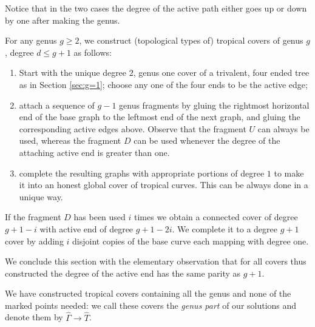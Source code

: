 \documentclass[11pt,reqno]{amsart}
\theoremstyle{definition}
\newcommand\trop{{\mathtt{trop}}}
\newcommand\Mgn[1]{\mathcal M_{#1}}
\newcommand{\gGamma}{\widehat{\Gamma}}
\newcommand{\gT}{\widehat{T}}
\begin{document}
Notice that in the two cases the degree of the active path either goes up or down by one after making the genus. %

For any genus $g\geq 2$, we construct (topological types of) tropical covers of genus $g$, degree $d\leq g+1$ as follows:
\begin{enumerate}
\item Start with the unique degree $2$,  genus one cover of a trivalent, four ended tree as in Section \ref{sec:g=1}; choose any one of the four ends to be the active edge;
\item attach a sequence of $g-1$ genus fragments by gluing the rightmost horizontal end of the base graph to the leftmost end of the next graph,  and gluing the corresponding active edges above. Observe that the fragment $U$ can always be used,  whereas the fragment $D$ can be used whenever the degree of the attaching active end is greater than one.
\item complete the resulting graphs with appropriate portions of degree $1$ to make it into an honest global cover of tropical curves. This can be always done in a unique way.
\end{enumerate}
If the fragment $D$ has been used $i$ times we obtain a connected cover of degree $g+1-i$ with  active end of degree $g+1-2i$. We complete it to a degree $g+1$ cover by adding $i$ disjoint copies of the  base curve each mapping with degree one.

We conclude this section with the elementary observation that for all covers thus constructed the degree of the active end has the same parity as $g+1$. 

We have constructed tropical	covers containing all the genus and none of the marked points needed: we call these covers the {\it genus part} of our solutions and denote them by $\gGamma \to \gT$. 
\end{document}
